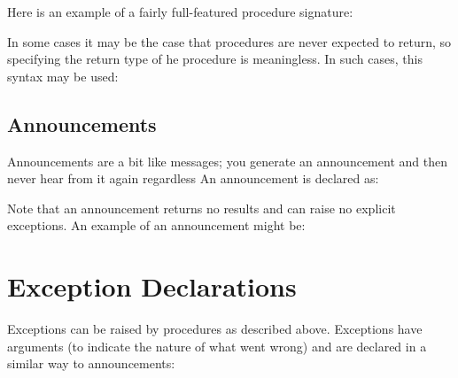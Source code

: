   Here is an example of a fairly full-featured procedure
signature: 


In some cases it may be the case that procedures are never expected to
return, so specifying the return type of he procedure is
meaningless. In such cases, this syntax may be used:

\idltabbing{
\idlliteral{operation}
{\tt : PROC [}
\idlliteral{arguments}
{\tt ]} \\
\> \> {\tt NEVER RETURNS}
{\tt RAISES }
\idlliteral{exceptions}
]
{\tt ;} }

\subsection{Announcements}

  Announcements are a bit like messages; you generate an announcement
and then never hear from it again regardless 
An announcement is declared as:

  Note that an announcement returns no results and can raise no
explicit exceptions. An example of an
announcement might be:


\section{Exception Declarations}

  Exceptions can be raised by procedures as described above.
Exceptions have arguments (to indicate the nature of what went wrong)
and are declared in a similar way to announcements:

